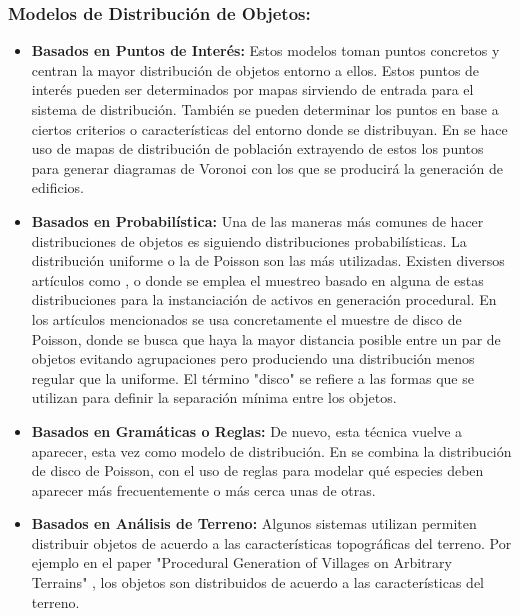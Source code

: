             \subsubsection{Modelos de Distribución de Objetos: }
                \begin{itemize}
                    \item \textbf{Basados en Puntos de Interés: }Estos modelos toman puntos concretos y centran la mayor distribución de objetos entorno a ellos. Estos puntos de interés pueden ser determinados por mapas sirviendo de entrada para el sistema de distribución. También se pueden determinar los puntos en base a ciertos criterios o características del entorno donde se distribuyan. En \cite{Parish2001} se hace uso de mapas de distribución de población extrayendo de estos los puntos para generar diagramas de Voronoi con los que se producirá la generación de edificios.
                    \item \textbf{Basados en Probabilística: }Una de las maneras más comunes de hacer distribuciones de objetos es siguiendo distribuciones probabilísticas. La distribución uniforme o la de Poisson son las más utilizadas. Existen diversos artículos como \cite{autobiomes}, \cite{landmasses-terrain} o \cite{GaschGarcia2021} donde se emplea el muestreo basado en alguna de estas distribuciones para la instanciación de activos en generación procedural. En los artículos mencionados se usa concretamente el muestre de disco de Poisson, donde se busca que haya la mayor distancia posible entre un par de objetos evitando agrupaciones pero produciendo una distribución menos regular que la uniforme. El término "disco" se refiere a las formas que se utilizan para definir la separación mínima entre los objetos.
                    \item \textbf{Basados en Gramáticas o Reglas: }De nuevo, esta técnica vuelve a aparecer, esta vez como modelo de distribución. En \cite{autobiomes} se combina la distribución de disco de Poisson, con el uso de reglas para modelar qué especies deben aparecer más frecuentemente o más cerca unas de otras. 
                    \item \textbf{Basados en Análisis de Terreno: }Algunos sistemas utilizan permiten distribuir objetos de acuerdo a las características topográficas del terreno. Por ejemplo en el paper "Procedural Generation of Villages on Arbitrary Terrains" \cite{Emilien2012}, los objetos son distribuidos de acuerdo a las características del terreno.
                \end{itemize}

